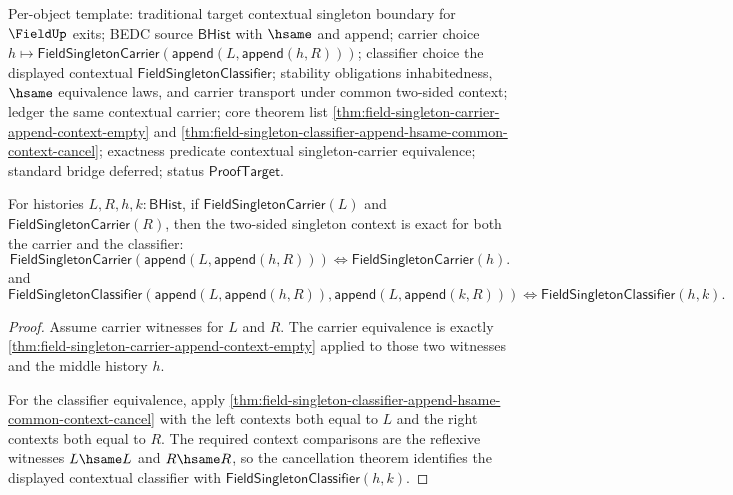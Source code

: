 Per-object template: traditional target contextual singleton boundary for
$\FieldUp$ exits; BEDC source $\mathsf{BHist}$ with $\hsame$ and append;
carrier choice
$h\mapsto\mathsf{FieldSingletonCarrier}(\mathsf{append}(L,\mathsf{append}(h,R)))$;
classifier choice the displayed contextual $\mathsf{FieldSingletonClassifier}$;
stability obligations inhabitedness, $\hsame$ equivalence laws, and carrier
transport under common two-sided context; ledger the same contextual carrier;
core theorem list
\autoref{thm:field-singleton-carrier-append-context-empty} and
\autoref{thm:field-singleton-classifier-append-hsame-common-context-cancel};
exactness predicate contextual singleton-carrier equivalence; standard bridge
deferred; status $\mathsf{ProofTarget}$.

\begin{theorem}
\label{thm:field-singleton-two-sided-context-exactness}
For histories $L,R,h,k:\mathsf{BHist}$, if
$\mathsf{FieldSingletonCarrier}(L)$ and
$\mathsf{FieldSingletonCarrier}(R)$, then the two-sided singleton context is
exact for both the carrier and the classifier:
$$
\mathsf{FieldSingletonCarrier}(\mathsf{append}(L,\mathsf{append}(h,R)))
\Longleftrightarrow
\mathsf{FieldSingletonCarrier}(h).
$$
and
$$
\mathsf{FieldSingletonClassifier}
  (\mathsf{append}(L,\mathsf{append}(h,R)),
   \mathsf{append}(L,\mathsf{append}(k,R)))
\Longleftrightarrow
\mathsf{FieldSingletonClassifier}(h,k).
$$
\end{theorem}
\begin{proof}
Assume carrier witnesses for $L$ and $R$. The carrier equivalence is exactly
\autoref{thm:field-singleton-carrier-append-context-empty} applied to those
two witnesses and the middle history $h$.

For the classifier equivalence, apply
\autoref{thm:field-singleton-classifier-append-hsame-common-context-cancel}
with the left contexts both equal to $L$ and the right contexts both equal to
$R$. The required context comparisons are the reflexive witnesses
$L\hsame L$ and $R\hsame R$, so the cancellation theorem identifies the
displayed contextual classifier with
$\mathsf{FieldSingletonClassifier}(h,k)$.
\end{proof}
